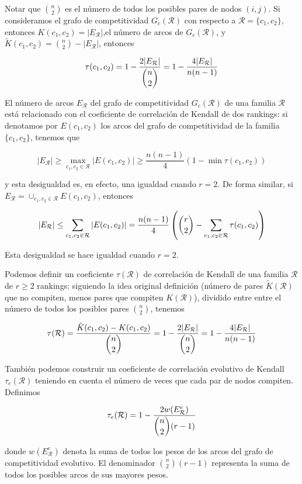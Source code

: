 \begin{nota}
Notar que $\binom{n}{2}$ es el número de todos los posibles pares de nodos $(i,j)$. Si consideramos el grafo de competitividad $G_c(\mathcal{R})$ con respecto a $\mathcal{R} = \{c_1, c_2\}$, entonces $K(c_1, c_2) = |E_\mathcal{R}|$,el número de arcos de $G_c(\mathcal{R})$, y $\tilde{K}(c_1, c_2) = \binom{n}{2} - |E_\mathcal{R}|$, entonces

\[ \tau(c_1,c_2) = 1 - \dfrac{2 |E_\mathcal{R}|}{\dbinom{n}{2}} = 1- \dfrac{4 |E_\mathcal{R}|}{n(n-1)} \]

El número de arcos $E_\mathcal{R}$ del grafo de competitividad $G_c(\mathcal{R})$ de una familia $\mathcal{R}$ está relacionado con el coeficiente de correlación de Kendall de dos rankings: si denotamos por $E(c_1, c_2)$ los arcos del grafo de competitividad de la familia $\{c_1, c_2\}$, tenemos que

\[ |E_\mathcal{R}| \geq \max_{c_1, c_2 \in \mathcal{R}} |E(c_1, c_2)| \geq \dfrac{n(n-1)}{4}(1 - \min \tau(c_1, c_2)) \]

y esta desigualdad es, en efecto, una igualdad cuando $r=2$. De forma similar, si $E_\mathcal{R} = \cup_{c_1, c_2 \in \mathcal{R}} E(c_1, c_2)$, entonces

\[ |E_\mathcal{R}| \leq \sum_{c_1, c_2 \in \mathcal{R}} |E(c_1, c_2)| = \dfrac{n(n-1)}{4} \left( \dbinom{r}{2} - \sum_{c_1, c_2 \in \mathcal{R}} \tau(c_1, c_2) \right) \]

Esta desigualdad se hace igualdad cuando $r=2$.
\end{nota}

\begin{defi}
Podemos definir un coeficiente $\tau(\mathcal{R})$ de correlación de Kendall de una familia $\mathcal{R}$ de $r \geq 2$ rankings: siguiendo la idea original definición (número de pares $\tilde{K}(\mathcal{R})$ que no compiten, menos pares que compiten $K(\mathcal{R})$), dividido entre entre el número de todos los posibles pares $\binom{n}{2}$, tenemos

\[ \tau(\mathcal{R}) = \dfrac{\tilde{K}(c_1,c_2) - K(c_1, c_2)}{\dbinom{n}{2}} = 1 - \dfrac{2 |E_\mathcal{R}|}{\dbinom{n}{2}} = 1 - \dfrac{4 |E_\mathcal{R}|}{n(n-1)} \]

También podemos construir un coeficiente de correlación evolutivo de Kendall $\tau_e(\mathcal{R})$ teniendo en cuenta el número de veces que cada par de nodos compiten. Definimos

\[ \tau_e(\mathcal{R}) = 1 - \dfrac{2w(E_\mathcal{R}^e)}{\dbinom{n}{2}(r-1)} \] 

donde $w(E_\mathcal{R}^e)$ denota la suma de todos los pesos de los arcos del grafo de competitividad evolutivo. El denominador  $\binom{n}{2}(r-1)$ representa la suma de todos los posibles arcos de sus mayores pesos.
\end{defi}

